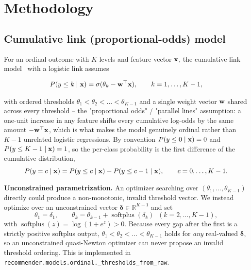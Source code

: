 \section{Methodology}
\label{sec:methodology}

\subsection{Cumulative link (proportional-odds) model}

For an ordinal outcome with $K$ levels and feature vector $\mathbf{x}$, the
cumulative-link model~\cite{mccullagh1980,agresti2010} with a logistic link
assumes

\begin{equation}
  P(y \le k \mid \mathbf{x}) = \sigma(\theta_k - \mathbf{w}^\top \mathbf{x}),
  \qquad k = 1, \dots, K - 1,
  \label{eq:cumulative-link}
\end{equation}

with ordered thresholds $\theta_1 < \theta_2 < \dots < \theta_{K-1}$ and a
single weight vector $\mathbf{w}$ shared across every threshold -- the
"proportional odds" / "parallel lines" assumption: a one-unit increase in any
feature shifts every cumulative log-odds by the same amount
$-\mathbf{w}^\top \mathbf{x}$, which is what makes the model genuinely ordinal rather
than $K-1$ unrelated logistic regressions. By convention
$P(y \le 0 \mid \mathbf{x}) = 0$ and $P(y \le K - 1 \mid \mathbf{x}) = 1$, so the
per-class probability is the first difference of the cumulative
distribution,
\begin{equation}
  P(y = c \mid \mathbf{x}) = P(y \le c \mid \mathbf{x}) - P(y \le c - 1 \mid \mathbf{x}),
  \qquad c = 0, \dots, K - 1.
  \label{eq:class-prob}
\end{equation}

\textbf{Unconstrained parametrization.} An optimizer searching over
$(\theta_1, \dots, \theta_{K-1})$ directly could produce a non-monotonic,
invalid threshold vector. We instead optimize over an unconstrained vector
$\boldsymbol{\delta} \in \mathbb{R}^{K-1}$ and set
\begin{equation}
  \theta_1 = \delta_1, \qquad
  \theta_k = \theta_{k-1} + \operatorname{softplus}(\delta_k)
  \;\; (k = 2, \dots, K-1),
\end{equation}
with $\operatorname{softplus}(z) = \log(1 + e^z) > 0$. Because every gap
after the first is a strictly positive softplus output, $\theta_1 < \theta_2
< \dots < \theta_{K-1}$ holds for \emph{any} real-valued $\boldsymbol{\delta}$,
so an unconstrained quasi-Newton optimizer can never propose an invalid
threshold ordering. This is implemented in
\texttt{recommender.models.ordinal.\_thresholds\_from\_raw}.


